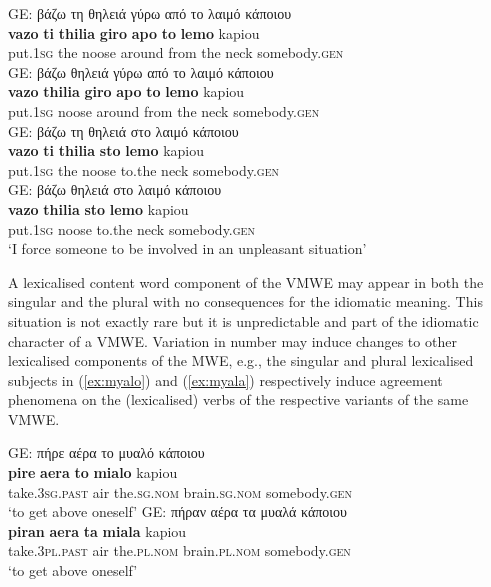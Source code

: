 \documentclass[output=paper,colorlinks,citecolor=brown]{langscibook}
\begin{document}
\ea
\label{ex:noose}
\begin{xlist}
\ex
GE: βάζω τη θηλειά γύρω από το λαιμό κάποιου\\
\gll \textbf{{vazo}} \textbf{{ti}} \textbf{{thilia}} \textbf{{giro}} \textbf{{apo}} \textbf{{to}}  \textbf{{lemo}} kapiou\\
put.\textsc{1sg} the noose around from the neck somebody.\textsc{gen}\\
\ex
GE: βάζω  θηλειά γύρω από το λαιμό κάποιου\\
\gll \textbf{{vazo}}  \textbf{{thilia}} \textbf{{giro}} \textbf{{apo}} \textbf{{to}}  \textbf{{lemo}} kapiou\\
put.\textsc{1sg}  noose around from the  neck somebody.\textsc{gen}\\
\ex
GE: βάζω τη θηλειά στο λαιμό κάποιου\\
\gll \textbf{{vazo}} \textbf{{ti}} \textbf{{thilia}}  \textbf{{sto}}  \textbf{{lemo}} kapiou\\
put.\textsc{1sg} the noose to.the neck somebody.\textsc{gen}\\
\ex
GE: βάζω  θηλειά στο λαιμό κάποιου\\
\gll \textbf{{vazo}}  \textbf{{thilia}}  \textbf{{sto}}  \textbf{{lemo}} kapiou\\
put.\textsc{1sg} noose  to.the neck somebody.\textsc{gen}\\
\glt ‘I force someone to be involved in an unpleasant situation'
\end{xlist}
\z

A lexicalised content word component of the VMWE may appear in both the singular and the plural with no consequences for the idiomatic meaning. This situation is not exactly rare but it is unpredictable and part of the idiomatic character of a VMWE. Variation in number may induce changes to other lexicalised components of the MWE, e.g., the singular and plural lexicalised subjects in (\ref{ex:myalo}) and (\ref{ex:myala}) respectively induce agreement phenomena on the (lexicalised) verbs of the respective variants of the same  VMWE. 

\ea
\begin{xlist}
\ex
\label{ex:myalo}
GE: πήρε αέρα το μυαλό κάποιου\\
\gll \textbf{{pire}} \textbf{{aera}} \textbf{{to}} \textbf{{mialo}} kapiou \\
take.\textsc{3sg.past} air the.\textsc{sg.nom} brain.\textsc{sg.nom} somebody.\textsc{gen} \\
\glt `to get above oneself'
\ex
\label{ex:myala}
GE: πήραν αέρα τα μυαλά κάποιου\\
\gll \textbf{{piran}} \textbf{{aera}} \textbf{{ta}} \textbf{{miala}} kapiou\\
take.\textsc{3pl.past} air the.\textsc{pl.nom} brain.\textsc{pl.nom} somebody.\textsc{gen}\\
\glt `to get above oneself'
\end{xlist}
\z
\end{document}

